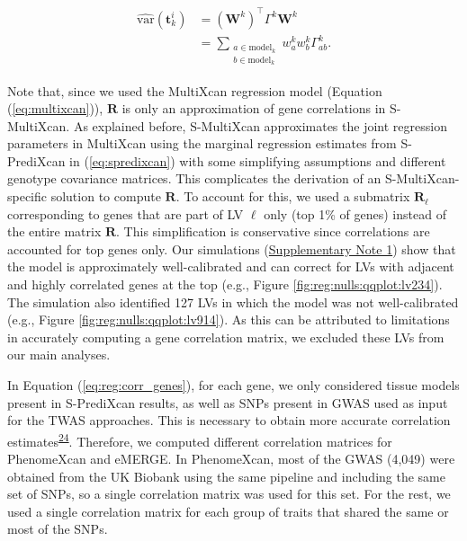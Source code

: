 \documentclass[
  a4paper,
]{article}
\begin{document}
\begin{equation}
\begin{split}
\widehat{\mathrm{var}}(\mathbf{t}_k^i) & = (\mathbf{W}^k)^\top \Gamma^k \mathbf{W}^k \\
        & = \sum_{\substack{a \in \mathrm{model}_k \\ b \in \mathrm{model}_k}} w_a^k w_b^k \Gamma_{ab}^k.
\end{split}
\label{eq:reg:var_gene}\end{equation}

Note that, since we used the MultiXcan regression model (Equation (\ref{eq:multixcan})), \(\mathbf{R}\) is only an approximation of gene correlations in S-MultiXcan.
As explained before, S-MultiXcan approximates the joint regression parameters in MultiXcan using the marginal regression estimates from S-PrediXcan in (\ref{eq:spredixcan}) with some simplifying assumptions and different genotype covariance matrices.
This complicates the derivation of an S-MultiXcan-specific solution to compute \(\mathbf{R}\).
To account for this, we used a submatrix \(\mathbf{R}_{\ell}\) corresponding to genes that are part of LV \(\ell\) only (top 1\% of genes) instead of the entire matrix \(\mathbf{R}\).
This simplification is conservative since correlations are accounted for top genes only.
Our simulations (\protect\hyperlink{sm:reg:null_sim}{Supplementary Note 1}) show that the model is approximately well-calibrated and can correct for LVs with adjacent and highly correlated genes at the top (e.g., Figure \ref{fig:reg:nulls:qqplot:lv234}).
The simulation also identified 127 LVs in which the model was not well-calibrated (e.g., Figure \ref{fig:reg:nulls:qqplot:lv914}).
As this can be attributed to limitations in accurately computing a gene correlation matrix, we excluded these LVs from our main analyses.

In Equation (\ref{eq:reg:corr_genes}), for each gene, we only considered tissue models present in S-PrediXcan results, as well as SNPs present in GWAS used as input for the TWAS approaches.
This is necessary to obtain more accurate correlation estimates\textsuperscript{\protect\hyperlink{ref-1FFzCXo1s}{24}}.
Therefore, we computed different correlation matrices for PhenomeXcan and eMERGE.
In PhenomeXcan, most of the GWAS (4,049) were obtained from the UK Biobank using the same pipeline and including the same set of SNPs, so a single correlation matrix was used for this set.
For the rest, we used a single correlation matrix for each group of traits that shared the same or most of the SNPs.
\end{document}
